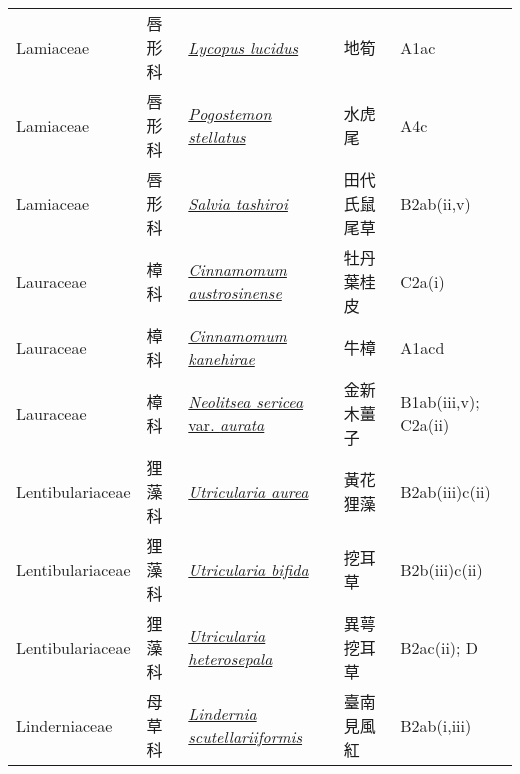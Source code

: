 {\begin{longtable}{p{2.5cm}p{2.5cm}p{4.5cm}p{2.5cm}p{3cm}}
    Lamiaceae & 唇形科 & \href{http://www.theplantlist.org/tpl1.1/search?q=Lycopus+lucidus}{\textit{Lycopus lucidus} } & 地筍 & A1ac \index{Lycopus@\textit{Lycopus}!lucidus@\textit{lucidus}}  \index{地筍} \\
    Lamiaceae & 唇形科 & \href{http://www.theplantlist.org/tpl1.1/search?q=Pogostemon+stellatus}{\textit{Pogostemon stellatus} } & 水虎尾 & A4c \index{Pogostemon@\textit{Pogostemon}!stellatus@\textit{stellatus}}  \index{水虎尾} \\
    Lamiaceae & 唇形科 & \href{http://www.theplantlist.org/tpl1.1/search?q=Salvia+tashiroi}{\textit{Salvia tashiroi} } & 田代氏鼠尾草 & B2ab(ii,v) \index{Salvia@\textit{Salvia}!tashiroi@\textit{tashiroi}}  \index{田代氏鼠尾草} \\
    Lauraceae & 樟科 & \href{http://www.theplantlist.org/tpl1.1/search?q=Cinnamomum+austrosinense}{\textit{Cinnamomum austrosinense} } & 牡丹葉桂皮 & C2a(i) \index{Cinnamomum@\textit{Cinnamomum}!austrosinense@\textit{austrosinense}}  \index{牡丹葉桂皮} \\
    Lauraceae & 樟科 & \href{http://www.theplantlist.org/tpl1.1/search?q=Cinnamomum+kanehirae}{\textit{Cinnamomum kanehirae} } & 牛樟 & A1acd \index{Cinnamomum@\textit{Cinnamomum}!kanehirae@\textit{kanehirae}}  \index{牛樟} \\
    Lauraceae & 樟科 & \href{http://www.theplantlist.org/tpl1.1/search?q=Neolitsea+sericea+var.+aurata}{\textit{Neolitsea sericea} var. \textit{aurata} } & 金新木薑子 & B1ab(iii,v); C2a(ii) \index{Neolitsea@\textit{Neolitsea}!sericea@\textit{sericea}!var. aurata@var. \textit{aurata}}  \index{金新木薑子} \\
    Lentibulariaceae & 狸藻科 & \href{http://www.theplantlist.org/tpl1.1/search?q=Utricularia+aurea}{\textit{Utricularia aurea} } & 黃花狸藻 & B2ab(iii)c(ii) \index{Utricularia@\textit{Utricularia}!aurea@\textit{aurea}}  \index{黃花狸藻} \\
    Lentibulariaceae & 狸藻科 & \href{http://www.theplantlist.org/tpl1.1/search?q=Utricularia+bifida}{\textit{Utricularia bifida} } & 挖耳草 & B2b(iii)c(ii) \index{Utricularia@\textit{Utricularia}!bifida@\textit{bifida}}  \index{挖耳草} \\
    Lentibulariaceae & 狸藻科 & \href{http://www.theplantlist.org/tpl1.1/search?q=Utricularia+heterosepala}{\textit{Utricularia heterosepala} } & 異萼挖耳草 & B2ac(ii); D \index{Utricularia@\textit{Utricularia}!heterosepala@\textit{heterosepala}}  \index{異萼挖耳草} \\
    Linderniaceae & 母草科 & \href{http://www.theplantlist.org/tpl1.1/search?q=Lindernia+scutellariiformis}{\textit{Lindernia scutellariiformis} } & 臺南見風紅 & B2ab(i,iii) \index{Lindernia@\textit{Lindernia}!scutellariiformis@\textit{scutellariiformis}}  \index{臺南見風紅} \\

\end{longtable}}
